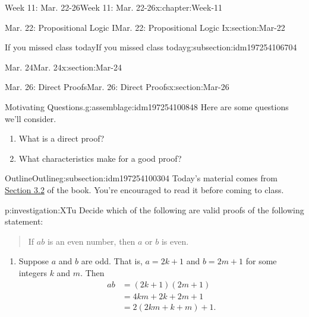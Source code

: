 \documentclass[oneside,10pt,]{book}
\numberwithin{equation}{section}
\newcommand{\amp}{&}
\begin{document}
\begin{chapterptx}{Week 11: Mar. 22-26}{}{Week 11: Mar. 22-26}{}{}{x:chapter:Week-11}
\begin{sectionptx}{Mar. 22: Propositional Logic I}{}{Mar. 22: Propositional Logic I}{}{}{x:section:Mar-22}
\begin{subsectionptx}{If you missed class today}{}{If you missed class today}{}{}{g:subsection:idm197254106704}
\end{subsectionptx}
\end{sectionptx}
%
%
\typeout{************************************************}
\typeout{************************************************}
%
\begin{sectionptx}{Mar. 24}{}{Mar. 24}{}{}{x:section:Mar-24}
\end{sectionptx}
%
%
\typeout{************************************************}
\typeout{************************************************}
%
\begin{sectionptx}{Mar. 26: Direct Proofs}{}{Mar. 26: Direct Proofs}{}{}{x:section:Mar-26}
\begin{introduction}{}%
\begin{assemblage}{Motivating Questions.}{g:assemblage:idm197254100848}%
Here are some questions we'll consider. %
\begin{enumerate}
\item{}What is a direct proof?%
\item{}What characteristics make for a good proof?%
\end{enumerate}
%
\end{assemblage}
\end{introduction}%
%
%
\typeout{************************************************}
\typeout{************************************************}
%
\begin{subsectionptx}{Outline}{}{Outline}{}{}{g:subsection:idm197254100304}
Today's material comes from \href{http://discrete.openmathbooks.org/dmoi3/sec_logic-proofs.html}{Section 3.2} of the book. You're encouraged to read it before coming to class.%
\begin{investigation}{}{p:investigation:XTu}%
Decide which of the following are valid proofs of the following statement:%
\begin{quote}%
If \(a b\) is an even number, then \(a\) or \(b\) is even.%
\end{quote}
%
\begin{enumerate}
\item{}Suppose \(a\) and \(b\) are odd. That is, \(a=2k+1\) and \(b=2m+1\) for some integers \(k\) and \(m\). Then%
\begin{align*}
ab \amp =(2k+1)(2m+1)\\
\amp =4km+2k+2m+1\\
\amp =2(2km+k+m)+1\text{.}
\end{align*}

\end{enumerate}
\end{investigation}
\end{subsectionptx}
\end{sectionptx}
\end{chapterptx}
\end{document}
